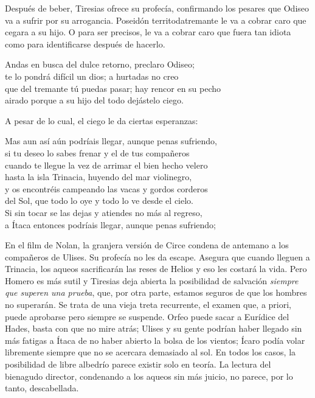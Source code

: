 Después de beber, Tiresias ofrece su profecía, confirmando los pesares que Odiseo va a sufrir por su arrogancia. Poseidón territodatremante le va a cobrar caro que cegara a su hijo. O para ser precisos, le va a cobrar caro que fuera tan idiota como para identificarse después de hacerlo.

\begin{versocita}
Andas en busca del dulce retorno, preclaro Odiseo;\\
te lo pondrá difícil un dios; a hurtadas no creo\\
que del tremante tú puedas pasar; hay rencor en su pecho\\
airado porque a su hijo del todo dejástelo ciego.
\end{versocita}

A pesar de lo cual, el ciego le da ciertas esperanzas:

\begin{versocita}
Mas aun así aún podríais llegar, aunque penas sufriendo,\\
si tu deseo lo sabes frenar y el de tus compañeros\\
cuando te llegue la vez de arrimar el bien hecho velero\\
hasta la isla Trinacia, huyendo del mar violinegro,\\
y os encontréis campeando las vacas y gordos corderos\\
del Sol, que todo lo oye y todo lo ve desde el cielo.\\
Si sin tocar se las dejas y atiendes no más al regreso,\\
a Ítaca entonces podríais llegar, aunque penas sufriendo;
\end{versocita}

En el film de Nolan, la granjera versión de Circe condena de antemano a los compañeros de Ulises. Su profecía no les da escape. Asegura que cuando lleguen a Trinacia, los aqueos sacrificarán las reses de Helios y eso les costará la vida. Pero Homero es más sutil y Tiresias deja abierta la posibilidad de salvación \emph{siempre que superen una prueba}, que, por otra parte, estamos seguros de que los hombres no superarán. Se trata de una vieja treta recurrente, el examen que, a priori, puede aprobarse pero siempre se suspende. Orfeo puede sacar a Eurídice del Hades, basta con que no mire atrás; Ulises y su gente podrían haber llegado sin más fatigas a Ítaca de no haber abierto la bolsa de los vientos; Ícaro podía volar libremente siempre que no se acercara demasiado al sol. En todos los casos, la posibilidad de libre albedrío parece existir solo en teoría. La lectura del bienagudo director, condenando a los aqueos sin más juicio, no parece, por lo tanto, descabellada.

